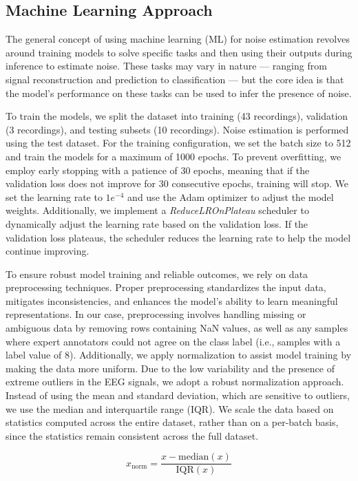 \subsection{Machine Learning Approach}
The general concept of using machine learning (ML) for noise estimation revolves around training models to solve specific tasks and then using their outputs during inference to estimate noise. These tasks may vary in nature — ranging from signal reconstruction and prediction to classification — but the core idea is that the model’s performance on these tasks can be used to infer the presence of noise.

To train the models, we split the dataset into training (43 recordings), validation (3 recordings), and testing subsets (10 recordings). Noise estimation is performed using the test dataset. For the training configuration, we set the batch size to 512 and train the models for a maximum of 1000 epochs. To prevent overfitting, we employ early stopping with a patience of 30 epochs, meaning that if the validation loss does not improve for 30 consecutive epochs, training will stop. We set the learning rate to $1e^{-4}$ and use the Adam optimizer to adjust the model weights. Additionally, we implement a \emph{ReduceLROnPlateau} scheduler to dynamically adjust the learning rate based on the validation loss. If the validation loss plateaus, the scheduler reduces the learning rate to help the model continue improving.

To ensure robust model training and reliable outcomes, we rely on data preprocessing techniques. Proper preprocessing standardizes the input data, mitigates inconsistencies, and enhances the model’s ability to learn meaningful representations. In our case, preprocessing involves handling missing or ambiguous data by removing rows containing NaN values, as well as any samples where expert annotators could not agree on the class label (i.e., samples with a label value of 8). Additionally, we apply normalization to assist model training by making the data more uniform. Due to the low variability and the presence of extreme outliers in the EEG signals, we adopt a robust normalization approach. Instead of using the mean and standard deviation, which are sensitive to outliers, we use the median and interquartile range (IQR). We scale the data based on statistics computed across the entire dataset, rather than on a per-batch basis, since the statistics remain consistent across the full dataset.

\begin{equation}
    x_{\text{norm}} = \frac{x - \text{median}(x)}{\text{IQR}(x)} \label{eq:robust_norm}
\end{equation}

